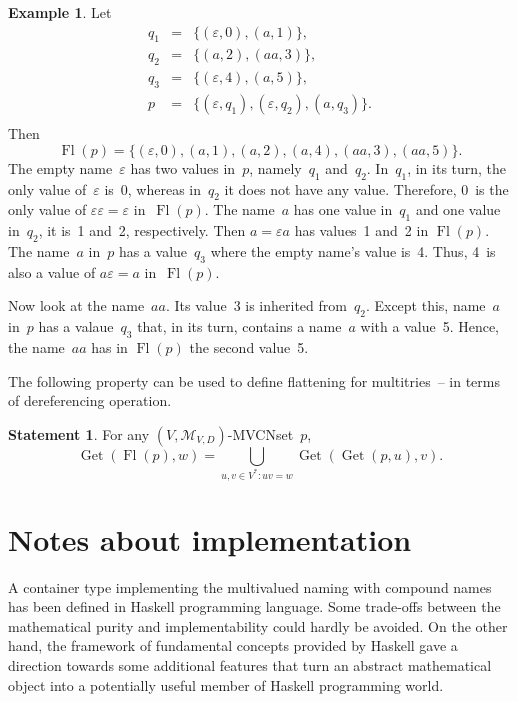 \documentclass{article}
\theoremstyle{definition}
\newtheorem{St}{Statement}
\newtheorem{Ex}{Example}
\newcommand{\setcharmvcn}{M}
\newcommand{\setsymbol}[3]{\mathcal{#1}_{#2,#3}}
\newcommand{\setmvcn}[2]{\setsymbol{\setcharmvcn}{#1}{#2}}
\newcommand{\flatten}{\operatorname{Fl}}
\newcommand{\deref}{\operatorname{Get}}
\begin{document}
\begin{Ex}\label{ex:flatten}
Let
\begin{eqnarray*}
  q_1 & = & \{ (\varepsilon, 0), (a, 1) \} ,\\
  q_2 & = & \{ (a, 2), (aa, 3) \} ,\\
  q_3 & = & \{ (\varepsilon, 4), (a, 5) \} ,\\
  p   & = & \{ (\varepsilon, q_1), (\varepsilon, q_2), (a, q_3) \} .\\
\end{eqnarray*}
Then
\[
  \flatten(p) = \{
      (\varepsilon, 0), (a, 1), (a, 2), (a, 4), (aa, 3), (aa, 5)
  \} .
\]
The empty name~$\varepsilon$ has two values in~$p$, namely~$q_1$ and~$q_2$.
In~$q_1$, in its turn, the only value of~$\varepsilon$ is~0, whereas in~$q_2$
it does not have any value. Therefore, 0~is the only value of $\varepsilon
\varepsilon = \varepsilon$ in~$\flatten(p)$.  The name~$a$ has one value in~$q_1$
and one value in~$q_2$, it is~1 and~2, respectively.  Then $a = \varepsilon a$
has values~1 and~2 in $\flatten(p)$.  The name~$a$ in~$p$ has a value~$q_3$
where the empty name's value is~4. Thus, 4~is also a value of $a \varepsilon =
a$ in~$\flatten(p)$.

Now look at the name~$aa$. Its value~3 is inherited from~$q_2$. Except this,
name~$a$ in~$p$ has a valaue~$q_3$ that, in its turn, contains a name~$a$ with
a value~5. Hence, the name~$aa$ has in $\flatten(p)$ the second value~5.
\end{Ex}

The following property can be used to define flattening for multitries~--
in terms of dereferencing operation.
\begin{St}\label{st:deref-flatten}
For any $(V,\setmvcn{V}{D})$-MVCNset~$p$,
\[
  \deref(\flatten(p), w) =
      \bigcup_{u,v\in V^\ast: uv = w}
        \deref(\deref(p, u), v) .
\]
\end{St}



\section{Notes about implementation}
 
A container type implementing the multivalued naming with compound names has
been defined in Haskell programming language. Some trade-offs between the
mathematical purity and implementability could hardly be avoided. On the other
hand, the framework of fundamental concepts provided by Haskell gave a
direction towards some additional features that turn an abstract mathematical
object into a potentially useful member of Haskell programming world.
\end{document}

